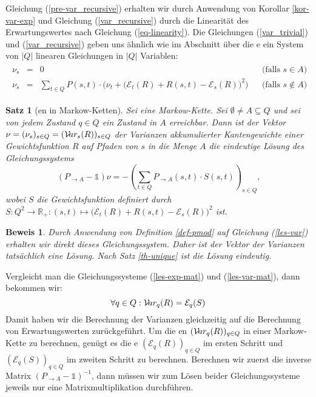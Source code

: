 \documentclass[a4paper]{article}
\newcommand{\mc}{Markow-Kette}
\newtheorem{satz}{Satz}[section] %
\theoremstyle{nonumberplain}
\newtheorem{beweis}{Beweis}
\begin{document}
Gleichung (\ref{pre-var_recursive}) erhalten wir durch Anwendung von Korollar \ref{kor-var-exp} und Gleichung (\ref{var_recursive}) durch die Linearität des Erwartungswertes nach Gleichung (\ref{eq-linearity}).
Die Gleichungen (\ref{var_trivial}) und (\ref{var_recursive}) geben uns ähnlich wie im Abschnitt über die \expect{}e ein System von $|Q|$ linearen Gleichungen in $|Q|$ Variablen:
\begin{align}
\begin{aligned}
	\nu_s & = & 0 && \text{(falls $s \in A$)}\\
	\nu_s & = & \sum_{t \in Q}{ P(s,t) \cdot \Big(\nu_t + \big(\mathcal{E}_{t}(R) + R(s,t) - \mathcal{E}_{s}(R)\big)^2\Big) } && \text{(falls $s \notin A$)}
\end{aligned}\label{les-var}
\end{align}

\begin{satz}[\var{}en in \mc{}n] \label{th-var}
		Sei \mcex{} eine \mc{}. Sei $\emptyset \neq A\subseteq Q$ und sei von jedem Zustand $q\in Q$ ein Zustand in $A$ erreichbar. Dann ist der Vektor $\nu = (\nu_s)_{s \in Q } = (\mathcal{V}\!ar_{s}(R))_{s \in Q }$ der Varianzen akkumulierter Kantengewichte einer Gewichtsfunktion $R$ auf Pfaden von $s$ in die Menge $A$ die eindeutige Lösung des Gleichungssystems	
	\begin{equation}
	(P_{\rightarrow A} - \mathbb{1}) \nu = - \left(\sum_{t \in Q}{ P_{\rightarrow A}(s,t) \cdot S(s,t) }\right)_{s \in Q}\text{,}\label{les-var-mat}
	\end{equation}
	wobei $S$ die Gewichtsfunktion definiert durch $S: Q^2 \to \mathbb{R}_+ : (s,t) \mapsto \big(\mathcal{E}_{t}(R) + R(s,t) - \mathcal{E}_{s}(R)\big)^2$ ist.
\end{satz}
\begin{beweis}
	Durch Anwendung von Definition \ref{def-pmod} auf Gleichung (\ref{les-var}) erhalten wir direkt dieses Gleichungssystem. Daher ist der Vektor der Varianzen tatsächlich eine Lösung. Nach Satz \ref{th-unique} ist die Lösung eindeutig.
\end{beweis}

Vergleicht man die Gleichungssysteme (\ref{les-exp-mat}) und (\ref{les-var-mat}), dann bekommen wir:
\begin{equation}
\forall q \in Q : \mathcal{V}\!ar_q(R) = \mathcal{E}_q(S)
\end{equation}
Damit haben wir die Berechnung der Varianzen gleichzeitig auf die Berechnung von Erwartungswerten zurückgeführt. Um die \var{}en $(\mathcal{V}\!ar_q(R))_{q\in Q}$ in einer \mc{} zu berechnen, genügt es die \expect{}e $(\mathcal{E}_q(R))_{q\in Q}$ im ersten Schritt und $(\mathcal{E}_q(S))_{q\in Q}$ im zweiten Schritt zu berechnen. 
Berechnen wir zuerst die inverse Matrix $(P_{\rightarrow A} - \mathbb{1})^{-1}$, dann müssen wir zum Lösen beider Gleichungssysteme jeweils nur eine Matrixmultiplikation durchführen.
\end{document}
